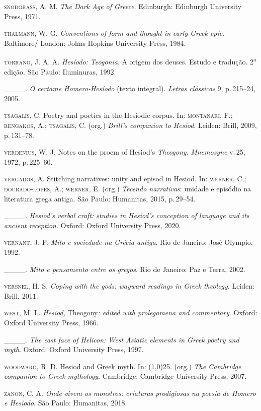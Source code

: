 \textsc{snodgrass}, A. M. \textit{The Dark Age of Greece}. Edinburgh: Edinburgh
University Press, 1971.

\textsc{thalmann}, W. G. \textit{Conventions of form and thought in early Greek
epic}. Baltimore/ London: Johns Hopkins University Press, 1984.

\textsc{torrano}, J. A. A. \textit{Hesíodo: Teogonia}. A origem dos deuses. Estudo
e tradução. 2\textsuperscript{a} edição. São Paulo: Iluminuras, 1992.

\_\_\_\_. \textit{O certame Homero-Hesíodo} (texto integral). \textit{Letras
clássicas} 9, p.\,215--24, 2005.

\textsc{tsagalis}, C. Poetry and poetics in the Hesiodic corpus. In: \textsc{montanari},
F.; \textsc{rengakos}, A.; \textsc{tsagalis}, C. (org.) \textit{Brill's companion to
Hesiod}. Leiden: Brill, 2009, p.\,131--78.

\textsc{verdenius}, W. J. Notes on the proem of Hesiod's \textit{Theogony}.
\textit{Mnemosyne} v.\,25, 1972, p.\,225--60.

\textsc{vergados}, A. Stitching narratives: unity and episod in Hesiod. In:
\textsc{werner}, C.; \textsc{dourado-lopes}, A.; \textsc{werner}, E. (org.) \textit{Tecendo
narrativas}: unidade e episódio na literatura grega antiga. São Paulo:
Humanitas, 2015, p.\,29--54.

\_\_\_\_. \textit{Hesiod's verbal craft: studies in Hesiod's conception of
language and its ancient reception}. Oxford: Oxford University Press,
2020.

\textsc{vernant}, J.-P. \textit{Mito e sociedade na Grécia antiga}. Rio de Janeiro:
José Olympio, 1992.

\_\_\_\_. \textit{Mito e pensamento entre os gregos}. Rio de Janeiro: Paz e
Terra, 2002.

\textsc{versnel}, H. S. \textit{Coping with the gods: wayward readings in Greek
theology}. Leiden: Brill, 2011.

\textsc{west}, M. L. \textit{Hesiod,} Theogony\textit{: edited with prolegomena and
commentary}. Oxford: Oxford University Press, 1966.

\_\_\_\_. \textit{The east face of Helicon: West Asiatic elements in Greek poetry
and myth}. Oxford: Oxford University Press, 1997.

\textsc{woodward}, R. D. Hesiod and Greek myth. In: \line(1,0){25}. (org.) \textit{The Cambridge
companion to Greek mythology}. Cambridge: Cambridge University Press,
2007.

\textsc{zanon}, C. A. \textit{Onde vivem os monstros: criaturas prodigiosas na
poesia de Homero e Hesíodo}. São Paulo: Humanitas, 2018.


